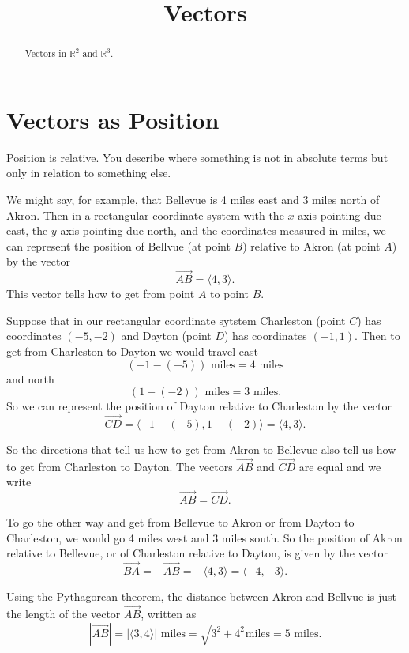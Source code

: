 \documentclass{ximera}
\title{Vectors}
\begin{document}
\begin{abstract}
Vectors in $\mathbb{R}^2$ and  $\mathbb{R}^3$.
\end{abstract}
\maketitle

\section{Vectors as Position}

Position is relative. You describe where something is not in absolute terms but only in relation to something else.

We might say, for example, that Bellevue is 4 miles east and 3 miles north of Akron. Then in a rectangular coordinate system with the $x$-axis pointing due east, the $y$-axis pointing due north, and the coordinates measured in miles, we can represent the position of Bellvue (at point $B$) relative to Akron (at point $A$) by the vector
\[
   \overrightarrow{AB} = \langle 4, 3 \rangle .
\]
This vector tells how to get from point $A$ to point $B$. 


Suppose that in our rectangular coordinate sytstem Charleston (point $C$) has coordinates $(-5,-2)$ and Dayton (point $D$) has coordinates $(-1,1)$. Then to get from Charleston to Dayton we would travel east
\[
     ( -1 - (-5) ) \text{ miles} = 4 \text{ miles}
\]
and north
\[
     ( 1 - (-2)) \text{ miles} = 3\text{ miles} .
\]
So we can represent the position of Dayton relative to Charleston by the vector
\[
  \overrightarrow{CD} =       \langle -1 - (-5) , 1- (-2)  \rangle   =  \langle 4, 3 \rangle .
\] 

So the directions that tell us how to get from Akron to Bellevue also tell us how to get from Charleston to Dayton. The
vectors $\overrightarrow{AB}$ and $\overrightarrow{CD}$ are equal and we write 
\[
      \overrightarrow{AB} = \overrightarrow{CD} .
\]

To go the other way and get from Bellevue to Akron or from Dayton to Charleston, we would go 4 miles west and 3 miles south. So the  position of Akron relative to Bellevue, or of Charleston relative to Dayton, is given by the vector
\[ 
   \overrightarrow{BA} = - \overrightarrow{AB} = - \langle 4,3 \rangle =  \langle -4,-3 \rangle.
\]

Using the Pythagorean theorem, the distance between Akron and Bellvue is just the length of the vector $\overrightarrow{AB}$, written as
\[
    | \overrightarrow{AB}  | =  | \langle 3, 4 \rangle  | \text{ miles} = \sqrt{3^2 + 4^2} \text{miles} = 5 \text{ miles} .
\] 
\end{document}
